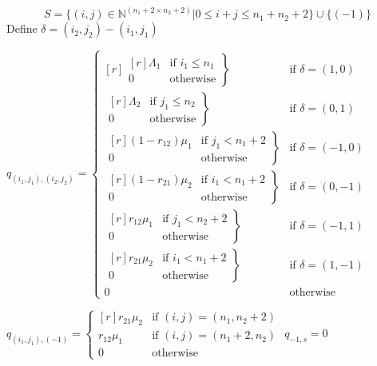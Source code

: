 \documentclass{beamer}
\begin{document}
\begin{frame}
\center
\scriptsize \[S = \{(i,j)\in\mathbb{N}^{(n_1+2\times n_2+2)}| 0 \leq i + j \leq n_1 + n_2 + 2\}\cup\{(-1)\}\]
Define $\delta = (i_2, j_2) - (i_1, j_1)$\newline

  $q_{(i_1, j_1),(i_2, j_2)} = \left\{
  \begin{matrix*}[ r ]
    \left. \begin{matrix*}[ r ]
      \Lambda_1 & \text{if } i_1 \leq n_1 \\
      0 & \text{otherwise}
    \end{matrix*} \right\} & \text{if } \delta = (1, 0) \\
    \left. \begin{matrix*}[ r ]
      \Lambda_2 & \text{if } j_1 \leq n_2 \\
      0 & \text{otherwise}
    \end{matrix*} \right\} & \text{if } \delta = (0, 1) \\
    \left. \begin{matrix*}[ r ]
      (1 - r_{12})\mu_1 & \text{if } j_1 < n_1 + 2 \\
      0 & \text{otherwise}
    \end{matrix*} \right\} & \text{if } \delta = (-1, 0) \\
    \left. \begin{matrix*}[ r ]
      (1 - r_{21})\mu_2 & \text{if } i_1 < n_1 + 2 \\
      0 & \text{otherwise}
    \end{matrix*} \right\} & \text{if } \delta = (0, -1) \\
    \left. \begin{matrix*}[ r ]
      r_{12}\mu_1 & \text{if } j_1 < n_2 + 2 \\
      0 & \text{otherwise}
    \end{matrix*} \right\} & \text{if } \delta = (-1, 1) \\
    \left. \begin{matrix*}[ r ]
      r_{21}\mu_2 & \text{if } i_1 < n_1 + 2 \\
      0 & \text{otherwise}
    \end{matrix*} \right\} & \text{if } \delta = (1, -1) \\
    0 & \text{otherwise}
  \end{matrix*} \right.$\newline\newline

$q_{(i_1, j_1), (-1)} = \left\{
  \begin{matrix*}[ r ]
    r_{21}\mu_2 & \text{if } (i, j) = (n_1, n_2 + 2) \\
    r_{12}\mu_1 & \text{if } (i, j) = (n_1 + 2, n_2) \\
    0 & \text{otherwise}
  \end{matrix*}
  \right.$\newline\newline
$q_{-1, s} = 0$
\end{frame}
\end{document}
